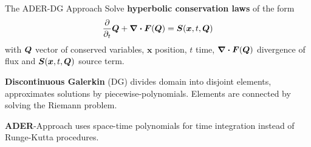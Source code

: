 \documentclass[aspectratio=169]{beamer}
\begin{document}
\begin{frame}{The ADER-DG Approach}
  Solve \textbf{hyperbolic conservation laws} of the form
\begin{equation}
  \label{eq:conservation-law}
 \frac{\partial}{\partial_t}  \Q + \divergence{\flux(\Q)} = \source(\bm{x}, t, \Q)
\end{equation}
with $\bm{Q}$ vector of conserved variables, $\bm{x}$ position, $t$ time,  $\divergence{\flux(\Q)}$ divergence of flux and $\source(\bm{x}, t, \Q)$ source term.

\textbf{Discontinuous Galerkin} (DG) divides domain into disjoint elements, approximates solutions by piecewise-polynomials.
Elements are connected by solving the Riemann problem.

\textbf{ADER}-Approach uses space-time polynomials for time integration instead of Runge-Kutta procedures.
\end{frame}
\end{document}
